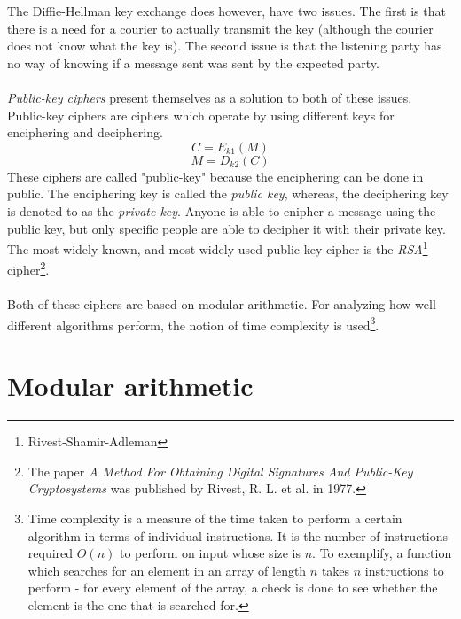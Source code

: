 \documentclass[a4paper, 12pt]{article}
\begin{document}
The Diffie-Hellman key exchange does however, have two issues. The first is that there is a need for a courier to 
actually transmit the key (although the courier does not know what the key is). The second issue is that the listening 
party has no way of knowing if a message sent was sent by the expected party.

\paragraph*{}
\textit{Public-key ciphers} present themselves as a solution to both of these issues. Public-key ciphers are ciphers 
which operate by using different keys for enciphering and deciphering.
\begin{equation} \label{pk-encipher}
C = E_{k1}(M)
\end{equation}
\begin{equation} \label{pk-decipher}
M = D_{k2}(C)
\end{equation}
These ciphers are called "public-key" because the enciphering can be done in public. The enciphering key is called the 
\textit{public key}, whereas, the deciphering key is denoted to as the \textit{private key}. Anyone is able to enipher 
a message using the public key, but only specific people are able to decipher it with their private key. The most 
widely known, and most widely used public-key cipher is the \textit{RSA}\footnote{Rivest-Shamir-Adleman} 
cipher\footnote{The paper \textit{A Method For Obtaining Digital Signatures And Public-Key Cryptosystems} was published
 by Rivest, R. L. et al. in 1977.}.

\paragraph*{}
Both of these ciphers are based on modular arithmetic. For analyzing how well different algorithms perform, the notion 
of time complexity is used\footnote{Time complexity is a measure of the time taken to perform a certain algorithm in 
terms of individual instructions. It is the number of instructions required $O(n)$ to perform on input whose size is 
$n$. To exemplify, a function which searches for an element in an array of length $n$ takes $n$ instructions to 
perform - for every element of the array, a check is done to see whether the element is the one that is searched for.}.

\section{Modular arithmetic}
\end{document}
